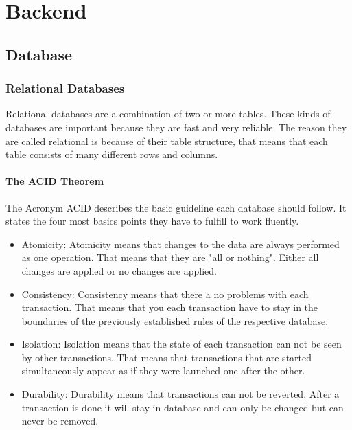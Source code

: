 \chapter{Backend}
\section{Database}
\subsection{Relational Databases}
    Relational databases are a combination of two or more tables.
    These kinds of databases are important because they are fast and very reliable. 
    The reason they are called relational is because of their table structure, that means that each table consists of many different rows and columns.
\subsubsection{The ACID Theorem}
The Acronym ACID describes the basic guideline each database should follow. It states the four most basics points they have to fulfill to work fluently.
\begin{itemize}
    \item Atomicity: Atomicity means that changes to the data are always performed as one operation. That means that they are "all or nothing". Either all changes are applied or no changes are applied.
    \item Consistency: Consistency means that there a no problems with each transaction. That means that you each transaction have to stay in the boundaries of the previously established rules of the respective database.
    \item Isolation: Isolation means that the state of each transaction can not be seen by other transactions. That means that transactions that are started simultaneously appear as if they were launched one after the other.
    \item Durability: Durability means that transactions can not be reverted. After a transaction is done it will stay in database and can only be changed but can never be removed.
\end{itemize}

